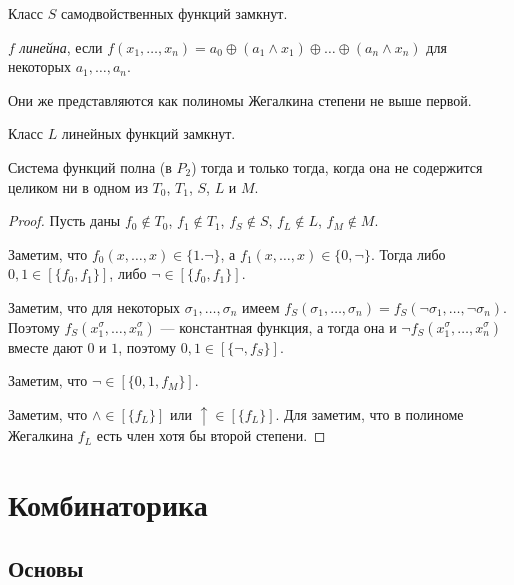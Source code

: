 \documentclass[12pt,a4paper]{article}
\begin{document}
    \begin{statement}
        Класс $S$ самодвойственных функций замкнут.
    \end{statement}

    \begin{definition}
        $f$ \emph{линейна}, если $f(x_1, \dots, x_n) = a_0 \oplus (a_1 \wedge x_1) \oplus \dots \oplus (a_n \wedge x_n)$ для некоторых $a_1, \dots, a_n$.

        Они же представляются как полиномы Жегалкина степени не выше первой.
    \end{definition}

    \begin{statement}
        Класс $L$ линейных функций замкнут.
    \end{statement}

    \begin{theorem}
        Система функций полна (в $P_2$) тогда и только тогда, когда она не содержится целиком ни в одном из $T_0$, $T_1$, $S$, $L$ и $M$.
    \end{theorem}

    \begin{proof}
        Пусть даны $f_0 \notin T_0$, $f_1 \notin T_1$, $f_S \notin S$, $f_L \notin L$, $f_M \notin M$.

        Заметим, что $f_0(x, \dots, x) \in \{1. \neg\}$, а $f_1(x, \dots, x) \in \{0, \neg\}$. Тогда либо $0, 1 \in [\{f_0, f_1\}]$, либо $\neg \in [\{f_0, f_1\}]$.

        Заметим, что для некоторых $\sigma_1, \dots, \sigma_n$ имеем $f_S(\sigma_1, \dots, \sigma_n) = f_S(\neg\sigma_1, \dots, \neg\sigma_n)$. Поэтому $f_S(x^\sigma_1, \dots, x^\sigma_n)$ --- константная функция, а тогда она и $\neg f_S(x^\sigma_1, \dots, x^\sigma_n)$ вместе дают $0$ и $1$, поэтому $0, 1 \in [\{\neg, f_S\}]$.

        Заметим, что $\neg \in [\{0, 1, f_M\}]$.

        Заметим, что $\wedge \in [\{f_L\}]$ или $\uparrow \in [\{f_L\}]$. Для заметим, что в полиноме Жегалкина $f_L$ есть член хотя бы второй степени.
    \end{proof}

    \section{Комбинаторика}

    \subsection{Основы}
\end{document}
